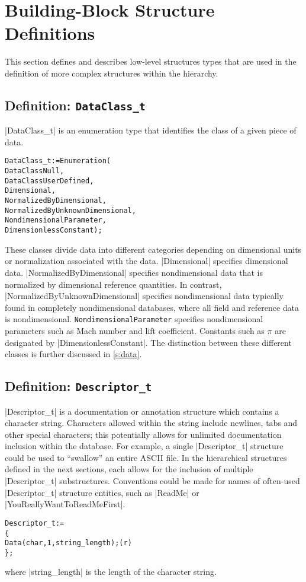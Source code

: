 \section{Building-Block Structure Definitions}
\label{s:build}
\thispagestyle{plain}

This section defines and describes low-level structures types that are
used in the definition of more complex structures within the hierarchy.

\subsection{Definition: \texttt{DataClass\_t}}
\label{s:DataClass}

|DataClass_t| is an enumeration type that identifies the class of a given
piece of data. 
\begin{alltt}
  DataClass\_t := Enumeration( 
    DataClassNull, 
    DataClassUserDefined,
    Dimensional,
    NormalizedByDimensional,
    NormalizedByUnknownDimensional,
    NondimensionalParameter,
    DimensionlessConstant ) ;
\end{alltt}
These classes divide data into different categories depending on
dimensional units or normalization associated with the data.
|Dimensional| specifies dimensional data.
|NormalizedByDimensional| specifies nondimensional data that is
normalized by dimensional reference quantities.
In contrast, |NormalizedByUnknownDimensional| specifies nondimensional
data typically found in completely nondimensional databases, where all
field and reference data is nondimensional.
\texttt{NondimensionalParameter} specifies nondimensional parameters
such as Mach number and lift coefficient.
Constants such as $\pi$ are designated by |DimensionlessConstant|.
The distinction between these different classes is further discussed
in \autoref{s:data}.

\subsection{Definition: \texttt{Descriptor\_t}}
\label{s:Descriptor}

|Descriptor_t| is a documentation or annotation structure which contains
a character string.
Characters allowed within the string include newlines, tabs and other
special characters; this potentially allows for unlimited documentation
inclusion within the database.
For example, a single |Descriptor_t| structure could be used to ``swallow''
an entire ASCII file.
In the hierarchical structures defined in the next sections, each allows
for the inclusion of multiple |Descriptor_t| substructures.
Conventions could be made for names of often-used |Descriptor_t|
structure entities, such as |ReadMe| or |YouReallyWantToReadMeFirst|.
\begin{alltt}
  Descriptor\_t :=
    \{
    Data(char, 1, string\_length) ;                                          (r)
    \} ;
\end{alltt}
where |string_length| is the length of the character string.

